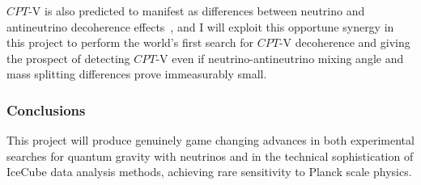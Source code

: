 \documentclass[a4paper,11pt]{article}
\begin{document}

$CPT$-V is also predicted to manifest as differences between neutrino and antineutrino decoherence effects~\cite{Mavromatos_2009, Barenboim:2004wu, Carrasco:2018sca, Buoninfante:2020iyr, Capolupo:2020myw}, and I will exploit this opportune synergy in this project to perform the world's first search for $CPT$-V decoherence and giving the prospect of detecting $CPT$-V even if neutrino-antineutrino mixing angle and mass splitting differences prove immeasurably small. \\

\subsubsection{Conclusions}



This project will produce genuinely game changing advances in both experimental searches for quantum gravity with neutrinos and in the technical sophistication of IceCube data analysis methods, achieving rare sensitivity to Planck scale physics. \\






\newpage
\end{document}
